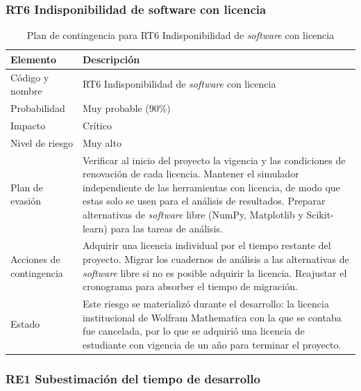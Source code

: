 \subsubsection{RT6 Indisponibilidad de software con licencia}

\begin{table}[H]
	\centering
	\renewcommand{\arraystretch}{1.2}
	\setlength{\tabcolsep}{4pt}
	\begin{tabular}{|p{}|p{}|}
		\hline
		\textbf{Elemento} & \textbf{Descripción} \\ \hline
		Código y nombre & RT6 Indisponibilidad de \textit{software} con licencia \\ \hline
		Probabilidad & Muy probable (90\%) \\ \hline
		Impacto & Crítico \\ \hline
		Nivel de riesgo & Muy alto \\ \hline
		Plan de evasión & 
		Verificar al inicio del proyecto la vigencia y las condiciones de renovación de cada licencia.
		Mantener el simulador independiente de las herramientas con licencia, de modo que estas solo se usen para el análisis de resultados.
		Preparar alternativas de \textit{software} libre (NumPy, Matplotlib y Scikit-learn) para las tareas de análisis. \\ \hline
		Acciones de contingencia & 
		Adquirir una licencia individual por el tiempo restante del proyecto.
		Migrar los cuadernos de análisis a las alternativas de \textit{software} libre si no es posible adquirir la licencia.
		Reajustar el cronograma para absorber el tiempo de migración. \\ \hline
		Estado & Este riesgo se materializó durante el desarrollo: la licencia institucional de Wolfram Mathematica con la que se contaba fue cancelada, por lo que se adquirió una licencia de estudiante con vigencia de un año para terminar el proyecto. \\ \hline
	\end{tabular}
	\caption{Plan de contingencia para RT6 Indisponibilidad de \textit{software} con licencia}
	\label{table:contingencia_licencia}
\end{table}

\subsubsection{RE1 Subestimación del tiempo de desarrollo}


